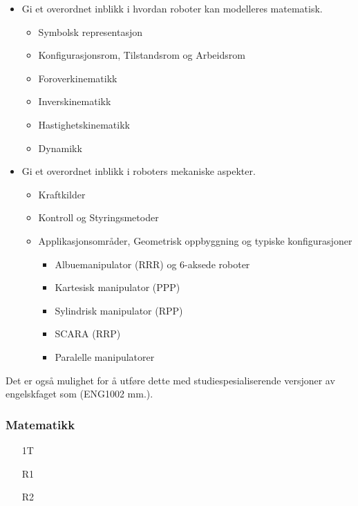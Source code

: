 		\begin{itemize}

			\item Gi et overordnet inblikk i hvordan roboter kan modelleres matematisk.
				\begin{itemize}
					\item Symbolsk representasjon
					\item Konfigurasjonsrom, Tilstandsrom og Arbeidsrom
					\item Foroverkinematikk
					\item Inverskinematikk
					\item Hastighetskinematikk
					\item Dynamikk
				\end{itemize}
			\item Gi et overordnet inblikk i roboters mekaniske aspekter.
			\begin{itemize}
				\item Kraftkilder
				\item Kontroll og Styringsmetoder
				\item Applikasjonsområder, Geometrisk oppbyggning og typiske konfigurasjoner
					\begin{itemize}
						\item Albuemanipulator (RRR) og 6-aksede roboter
						\item Kartesisk manipulator (PPP)
						\item Sylindrisk manipulator (RPP)
						\item SCARA (RRP)
						\item Paralelle manipulatorer
					\end{itemize}
			\end{itemize}
		\end{itemize}


		Det er også mulighet for å utføre dette med studiespesialiserende versjoner av engelskfaget som (ENG1002 mm.).


	\subsubsection*{Matematikk}

		\begin{itemize}

			\item[1T]
			\item[R1]
			\item[R2]

		\end{itemize}


